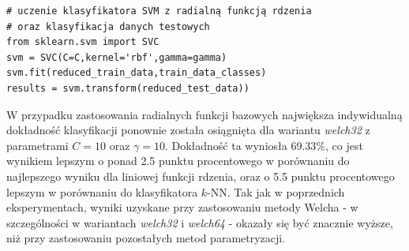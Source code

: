\documentclass[notitlepage]{report}
\begin{document}
\begin{lstlisting}
# uczenie klasyfikatora SVM z radialną funkcją rdzenia
# oraz klasyfikacja danych testowych
from sklearn.svm import SVC
svm = SVC(C=C,kernel='rbf',gamma=gamma)
svm.fit(reduced_train_data,train_data_classes)
results = svm.transform(reduced_test_data))
\end{lstlisting}

W przypadku zastosowania radialnych funkcji bazowych największa indywidualną dokładność klasyfikacji ponownie została osiągnięta dla wariantu \textit{welch32} z parametrami $C = 10$ oraz $\gamma = 10$. Dokładność ta wyniosła 69.33\%, co jest wynikiem lepszym o ponad 2.5 punktu procentowego w porównaniu do najlepszego wyniku dla liniowej funkcji rdzenia, oraz o 5.5 punktu procentowego lepszym w porównaniu do klasyfikatora $k$-NN. Tak jak w poprzednich eksperymentach, wyniki uzyskane przy zastosowaniu metody Welcha - w szczególności w wariantach  \textit{welch32} i \textit{welch64} - okazały się być znacznie wyższe, niż przy zastosowaniu pozostałych metod parametryzacji. 
\end{document}

